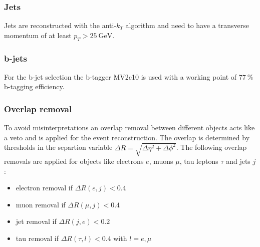 \subsubsection*{Jets}
Jets are reconstructed with the anti-$k_T$ algorithm and need to have a transverse momentum of at least $p_T>\SI{25}{\giga\electronvolt}$. 
\subsubsection*{b-jets}\label{physObj:bjet}
For the b-jet selection the b-tagger MV2c10 is used with a working point of $\SI{77}{\percent}$ b-tagging efficiency.
\subsubsection*{Overlap removal}\label{overlapremoval}
To avoid misinterpretations an overlap removal between different objects acts like a veto and is applied for the event reconstruction. The overlap is determined by thresholds in the separtion variable $\Delta R=\sqrt{\Delta\eta^2+\Delta\phi^2}$. The following overlap removals are applied for objects like electrons $e$, muons $\mu$, tau leptons $\tau$ and jets $j$:
\begin{itemize}
\item electron removal if $\Delta R(e,j)<0.4$
\item muon removal if $\Delta R(\mu,j)<0.4$
\item jet removal if $\Delta R(j,e)<0.2$
\item tau removal if $\Delta R(\tau,l)< 0.4$ with $l=e,\mu$
\end{itemize}
